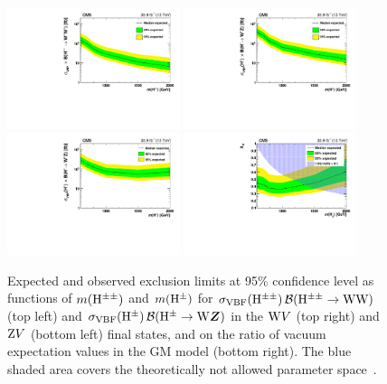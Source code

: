 \begin{figure}[!htbp]
\centering
\includegraphics[width=0.45\textwidth]{Plots/plots/limits_wpwp.pdf}
\includegraphics[width=0.45\textwidth]{Plots/plots/limits_wpz_lnu.pdf}
\includegraphics[width=0.45\textwidth]{Plots/plots/limits_wpz_ll.pdf}
\includegraphics[width=0.45\textwidth]{Plots/plots/limits_model.pdf}
\caption{Expected and observed exclusion limits at 95\% confidence level as functions of $m(\mathrm{H^{\pm\pm}})$ and $m(\mathrm{H}^{\pm})$ for $\sigma_\mathrm{VBF}(\mathrm{H^{\pm\pm}}) \, \mathcal{B}(\mathrm{H^{\pm\pm}}\to \mathrm{W}\mathrm{W})$ (top left) and $\sigma_\mathrm{VBF}(\mathrm{H}^{\pm}) \, \mathcal{B}(\mathrm{H}^{\pm}\to \mathrm{W}\boldsymbol{Z})$ in the  $\mathrm{W} V$ (top right) and $\mathrm{Z} V$ (bottom left) final states, and on the ratio of vacuum expectation values in the GM model (bottom right). The blue shaded area covers the theoretically not allowed parameter space~\cite{Zaro:2002500}.
}
\label{fig:limits}
\end{figure}


